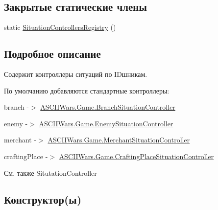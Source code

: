 \subsection*{Закрытые статические члены}
\begin{DoxyCompactItemize}
\item 
static \hyperlink{class_a_s_c_i_i_wars_1_1_game_1_1_situation_controllers_registry_a577021be8e7ca3bca0679a5123ced293}{Situation\+Controllers\+Registry} ()
\end{DoxyCompactItemize}


\subsection{Подробное описание}
Содержит контроллеры ситуаций по ID\textquotesingle{}шникам. 

По умолчанию добавляются стандартные контроллеры\+:
\begin{DoxyItemize}
\item {\ttfamily branch} -\/$>$ \hyperlink{class_a_s_c_i_i_wars_1_1_game_1_1_branch_situation_controller}{A\+S\+C\+I\+I\+Wars.\+Game.\+Branch\+Situation\+Controller}
\item {\ttfamily enemy} -\/$>$ \hyperlink{class_a_s_c_i_i_wars_1_1_game_1_1_enemy_situation_controller}{A\+S\+C\+I\+I\+Wars.\+Game.\+Enemy\+Situation\+Controller}
\item {\ttfamily merchant} -\/$>$ \hyperlink{class_a_s_c_i_i_wars_1_1_game_1_1_merchant_situation_controller}{A\+S\+C\+I\+I\+Wars.\+Game.\+Merchant\+Situation\+Controller}
\item {\ttfamily crafting\+Place} -\/$>$ \hyperlink{class_a_s_c_i_i_wars_1_1_game_1_1_crafting_place_situation_controller}{A\+S\+C\+I\+I\+Wars.\+Game.\+Crafting\+Place\+Situation\+Controller}
\end{DoxyItemize}

\begin{DoxySeeAlso}{См. также}
Situtation\+Controller 
\end{DoxySeeAlso}


\subsection{Конструктор(ы)}
\hypertarget{class_a_s_c_i_i_wars_1_1_game_1_1_situation_controllers_registry_a577021be8e7ca3bca0679a5123ced293}{}\label{class_a_s_c_i_i_wars_1_1_game_1_1_situation_controllers_registry_a577021be8e7ca3bca0679a5123ced293} 
